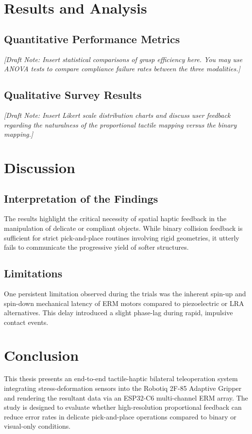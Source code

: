 \documentclass[12pt, a4paper]{report}
\begin{document}
\chapter{Results and Analysis}
\section{Quantitative Performance Metrics}
\textit{[Draft Note: Insert statistical comparisons of grasp efficiency here. You may use ANOVA tests to compare compliance failure rates between the three modalities.]}

\section{Qualitative Survey Results}
\textit{[Draft Note: Insert Likert scale distribution charts and discuss user feedback regarding the naturalness of the proportional tactile mapping versus the binary mapping.]}

\chapter{Discussion}
\section{Interpretation of the Findings}
The results highlight the critical necessity of spatial haptic feedback in the manipulation of delicate or compliant objects. While binary collision feedback is sufficient for strict pick-and-place routines involving rigid geometries, it utterly fails to communicate the progressive yield of softer structures.

\section{Limitations}
One persistent limitation observed during the trials was the inherent spin-up and spin-down mechanical latency of ERM motors compared to piezoelectric or LRA alternatives. This delay introduced a slight phase-lag during rapid, impulsive contact events.

\chapter{Conclusion}
This thesis presents an end-to-end tactile-haptic bilateral teleoperation system integrating stress-deformation sensors into the Robotiq 2F-85 Adaptive Gripper and rendering the resultant data via an ESP32-C6 multi-channel ERM array. The study is designed to evaluate whether high-resolution proportional feedback can reduce error rates in delicate pick-and-place operations compared to binary or visual-only conditions.
\end{document}
